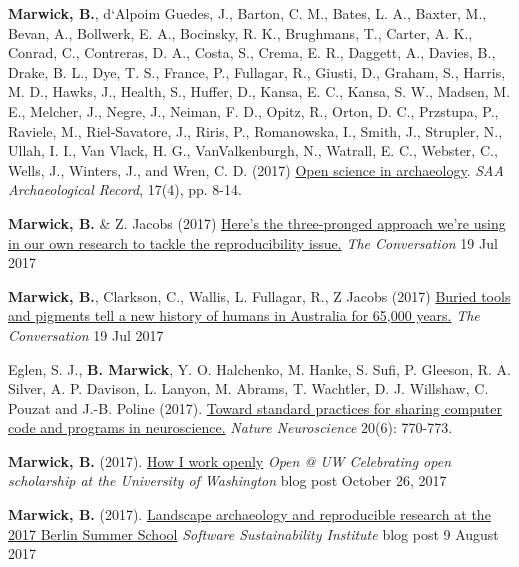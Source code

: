 \documentclass[11pt,article,oneside]{memoir}
\begin{document}
{{{\ind \textbf{Marwick, B.}, d`Alpoim Guedes, J., Barton, C. M., Bates, L. A., Baxter, M., Bevan, A., Bollwerk, E. A., Bocinsky, R. K., Brughmans, T., Carter, A. K., Conrad, C., Contreras, D. A., Costa, S., Crema, E. R., Daggett, A., Davies, B., Drake, B. L., Dye, T. S., France, P., Fullagar, R., Giusti, D., Graham, S., Harris, M. D., Hawks, J., Health, S., Huffer, D., Kansa, E. C., Kansa, S. W., Madsen, M. E., Melcher, J., Negre, J., Neiman, F. D., Opitz, R., Orton, D. C., Przstupa, P., Raviele, M., Riel-Savatore, J., Riris, P., Romanowska, I., Smith, J., Strupler, N., Ullah, I. I., Van Vlack, H. G., VanValkenburgh, N., Watrall, E. C., Webster, C., Wells, J., Winters, J., and Wren, C. D. (2017) \href{http://www.saa.org/Portals/0/SAA\_Record\_Sept\_2017\_Final\_LR.pdf\#page\=10}{Open science in archaeology}. \textit{SAA Archaeological Record}, 17(4), pp. 8-14. 

\ind \textbf{Marwick, B.} \& Z. Jacobs (2017) \href{https://theconversation.com/heres-the-three-pronged-approach-were-using-in-our-own-research-to-tackle-the-reproducibility-issue-80997}{Here’s the three-pronged approach we’re using in our own research to tackle the reproducibility issue.} \textit{The Conversation} 19 Jul 2017 

\ind \textbf{Marwick, B.}, Clarkson, C., Wallis, L. Fullagar, R., Z Jacobs (2017) \href{https://theconversation.com/buried-tools-and-pigments-tell-a-new-history-of-humans-in-australia-for-65-000-years-81021}{Buried tools and pigments tell a new history of humans in Australia for 65,000 years.} \textit{The Conversation} 19 Jul 2017 

\ind Eglen, S. J., \textbf{B. Marwick}, Y. O. Halchenko, M. Hanke, S. Sufi, P. Gleeson, R. A. Silver, A. P. Davison, L. Lanyon, M. Abrams, T. Wachtler, D. J. Willshaw, C. Pouzat and J.-B. Poline (2017). \href{http://www.nature.com/neuro/journal/v20/n6/full/nn.4550.html}{Toward standard practices for sharing computer code and programs in neuroscience.} \textit{Nature Neuroscience} 20(6): 770-773.

\ind \textbf{Marwick, B.} (2017). \href{https://blogs.uw.edu/openpub/2017/10/26/how-i-work-open-ben-marwick/}{How I work openly} \textit{Open @ UW Celebrating open scholarship at the University of Washington} blog post October 26, 2017 

\ind \textbf{Marwick, B.} (2017). \href{https://www.software.ac.uk/blog/2017-08-09-landscape-archaeology-and-reproducible-research-2017-berlin-summer-school}{Landscape archaeology and reproducible research at the 2017 Berlin Summer School} \textit{Software Sustainability Institute} blog post 9 August 2017 

}}}
\end{document}
